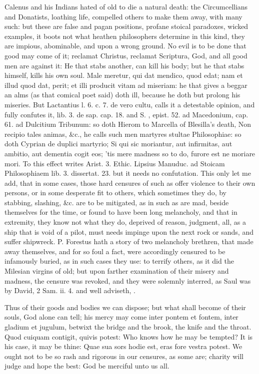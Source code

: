 Calenus and his Indians hated of old to die a natural death: the
Circumcellians and Donatists, loathing life, compelled others to make
them away, with many such: but these are false and pagan
positions, profane stoical paradoxes, wicked examples, it boots not
what heathen philosophers determine in this kind, they are impious,
abominable, and upon a wrong ground. No evil is to be done that good
may come of it; reclamat Christus, reclamat Scriptura, God, and all
good men are against it: He that stabs another, can kill his
body; but he that stabs himself, kills his own soul. Male
meretur, qui dat mendico, quod edat; nam et illud quod dat, perit; et
illi producit vitam ad miseriam: he that gives a beggar an alms (as
that comical poet said) doth ill, because he doth but prolong his
miseries. But Lactantius l. 6. c. 7. de vero cultu, calls it a
detestable opinion, and fully confutes it, lib. 3. de sap. cap. 18. and
S. \Austin, epist. 52. ad Macedonium, cap. 61. ad Dulcitium Tribunum: so
doth Hierom to Marcella of Blesilla's death, Non recipio tales animas,
\&c., he calls such men martyres stultae Philosophiae: so doth Cyprian
de duplici martyrio; Si qui sic moriantur, aut infirmitas, aut ambitio,
aut dementia cogit eos; 'tis mere madness so to do, furore est ne
moriare mori. To this effect writes Arist. 3. Ethic. Lipsius Manuduc.
ad Stoicam Philosophiaem lib. 3. dissertat. 23. but it needs no
confutation. This only let me add, that in some cases, those hard
censures of such as offer violence to their own persons, or in some
desperate fit to others, which sometimes they do, by stabbing,
slashing, \&c. are to be mitigated, as in such as are mad, beside
themselves for the time, or found to have been long melancholy, and
that in extremity, they know not what they do, deprived of reason,
judgment, all, as a ship that is void of a pilot, must needs
impinge upon the next rock or sands, and suffer shipwreck. P.
Forestus hath a story of two melancholy brethren, that made away
themselves, and for so foul a fact, were accordingly censured to be
infamously buried, as in such cases they use: to terrify others, as it
did the Milesian virgins of old; but upon farther examination of their
misery and madness, the censure was revoked, and they were
solemnly interred, as Saul was by David, 2 Sam. ii. 4. and \Seneca{} well
adviseth, .

Thus of their goods and bodies we can dispose; but what shall become of
their souls, God alone can tell; his mercy may come inter pontem et
fontem, inter gladium et jugulum, betwixt the bridge and the brook, the
knife and the throat. Quod cuiquam contigit, quivis potest: Who knows
how he may be tempted? It is his case, it may be thine: Quae sua
sors hodie est, eras fore vestra potest. We ought not to be so rash and
rigorous in our censures, as some are; charity will judge and hope the
best: God be merciful unto us all.
